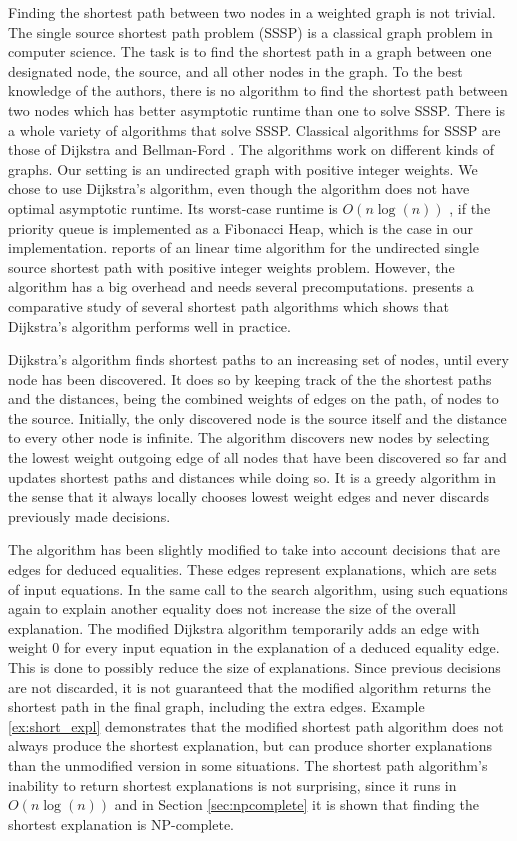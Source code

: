 Finding the shortest path between two nodes in a weighted graph is not trivial.
The single source shortest path problem (SSSP) is a classical graph problem in computer science.
The task is to find the shortest path in a graph between one designated node, the source, and all other nodes in the graph.
To the best knowledge of the authors, there is no algorithm to find the shortest path between two nodes which has better asymptotic runtime than one to solve SSSP.
There is a whole variety of algorithms that solve SSSP.
Classical algorithms for SSSP are those of Dijkstra \cite{Dijkstra1959} and Bellman-Ford \cite{Ford1956,Bellman1956}.
The algorithms work on different kinds of graphs.
Our setting is an undirected graph with positive integer weights.
We chose to use Dijkstra's algorithm, even though the algorithm does not have optimal asymptotic runtime.
Its worst-case runtime is $O(n \log(n))$ \cite{Cormen1989}, if the priority queue is implemented as a Fibonacci Heap, which is the case in our implementation.
\cite{Thorup1999} reports of an linear time algorithm for the undirected single source shortest path with positive integer weights problem.
However, the algorithm has a big overhead and needs several precomputations.
\cite{Cherkassky1996} presents a comparative study of several shortest path algorithms which shows that Dijkstra's algorithm performs well in practice.

Dijkstra's algorithm finds shortest paths to an increasing set of nodes, until every node has been discovered.
It does so by keeping track of the the shortest paths and the distances, being the combined weights of edges on the path, of nodes to the source.
Initially, the only discovered node is the source itself and the distance to every other node is infinite.
The algorithm discovers new nodes by selecting the lowest weight outgoing edge of all nodes that have been discovered so far and updates shortest paths and distances while doing so.
It is a greedy algorithm in the sense that it always locally chooses lowest weight edges and never discards previously made decisions.

The algorithm has been slightly modified to take into account decisions that are edges for deduced equalities.
These edges represent explanations, which are sets of input equations.
In the same call to the search algorithm, using such equations again to explain another equality does not increase the size of the overall explanation.
The modified Dijkstra algorithm temporarily adds an edge with weight 0 for every input equation in the explanation of a deduced equality edge.
This is done to possibly reduce the size of explanations.
Since previous decisions are not discarded, it is not guaranteed that the modified algorithm returns the shortest path in the final graph, including the extra edges.
Example \ref{ex:short_expl} demonstrates that the modified shortest path algorithm does not always produce the shortest explanation, but can produce shorter explanations than the unmodified version in some situations.
The shortest path algorithm's inability to return shortest explanations is not surprising, since it runs in $O(n \log(n))$ and in Section \ref{sec:npcomplete} it is shown that finding the shortest explanation is NP-complete.

